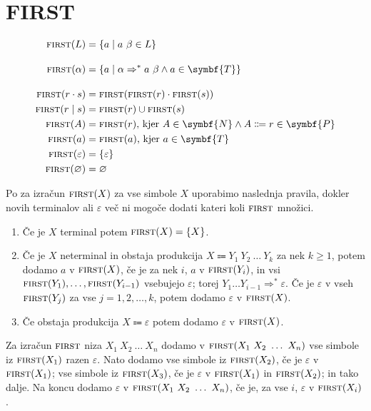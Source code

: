 \documentclass{report}
\newcommand{\Empty}{\varnothing}
\newcommand{\Null}{\varepsilon}
\newcommand{\Seq}{\cdot}
\newcommand{\Spc}{\ }
\newcommand{\Union}{\mathrel{|}}
\newcommand{\Set}[1]{\symbf{#1}}
\newcommand{\FIRST}{\textsc{first}}
\newcommand{\Terminals}{\Set{T}}
\newcommand{\Productions}{\Set{P}}
\newcommand{\NonTerminals}{\Set{N}}
\newcommand{\Arrow}{\Coloneq}
\newlength{\arrow}
\newcommand{\DeriveStar}{\Rightarrow^\ast}
\newcommand{\NT}[1]{{#1}}
\newcommand{\T}[1]{{#1}}
\newcommand{\Sym}[1]{{#1}}
\begin{document}
\section{FIRST}
\begin{tcolorbox}[title={Definicija}]
  \begin{equation*}
    \begin{aligned}
      \FIRST(L) &= \{ \T{a} \mid \T{a} \Spc \beta \in L \}\\[1em]
      \FIRST(\alpha) &= \{\T{a} \mid \alpha \DeriveStar \T{a} \Spc \beta \land \T{a} \in \Terminals\}\\[1em]
      \FIRST(r \Seq s) &= \FIRST(\FIRST(r) \Seq \FIRST(s))\\
      \FIRST(r \Union s) &= \FIRST(r) \cup \FIRST(s)\\
      \FIRST(\NT{A}) &= \FIRST(r)\text{, kjer } \T{A} \in \NonTerminals \land \NT{A} \Arrow r \in \Productions\\
      \FIRST(\T{a}) &= \FIRST(\T{a})\text{, kjer } \T{a} \in \Terminals\\
      \FIRST(\Null) &= \{\Null\}\\
      \FIRST(\Empty) &= \Empty
    \end{aligned}
  \end{equation*}
\end{tcolorbox}

Po \cite{dragonbook} za izračun $\FIRST(\Sym{X})$ za vse simbole $\Sym{X}$ uporabimo naslednja pravila, dokler novih terminalov ali $\Null$ več ni mogoče dodati kateri koli $\FIRST$ množici.

\begin{enumerate}
  \item Če je $\Sym{X}$ terminal potem $\FIRST(\Sym{X}) = \{\Sym{X}\}$.
  \item Če je $\Sym{X}$ neterminal in obstaja produkcija $\Sym{X} \Arrow \Sym{Y}_1 \Spc \Sym{Y}_2 \Spc \dots \Spc \Sym{Y}_k$ za nek $k \geq 1$, potem dodamo $\T{a}$ v $\FIRST(\Sym{X})$, če je za nek $i$, $\T{a}$ v $\FIRST(\Sym{Y}_i)$, in vsi $\FIRST(\Sym{Y}_1), \dots, \FIRST(\Sym{Y}_{i - 1})$ vsebujejo $\Null$; torej $\Sym{Y}_1 \dots \Sym{Y}_{i - 1} \DeriveStar \Null$.
    Če je $\Null$ v vseh $\FIRST(\Sym{Y}_j)$ za vse $j = 1, 2, \dots, k$, potem dodamo $\Null$ v $\FIRST(\Sym{X})$.
  \item Če obstaja produkcija $\Sym{X} \Arrow \Null$ potem dodamo $\Null$ v $\FIRST(\Sym{X})$.
\end{enumerate}

Za izračun $\FIRST$ niza $\Sym{X}_1 \Spc \Sym{X}_2 \Spc \dots \Spc \Sym{X}_n$ dodamo v $\FIRST(\Sym{X}_1 \Spc \Sym{X}_2 \Spc \dots \Spc \Sym{X}_n)$ vse simbole iz $\FIRST(\Sym{X}_1)$ razen $\Null$. Nato dodamo vse simbole iz $\FIRST(\Sym{X}_2)$, če je $\Null$ v $\FIRST(\Sym{X}_1)$; vse simbole iz $\FIRST(\Sym{X}_3)$, če je $\Null$ v $\FIRST(\Sym{X}_1)$ in $\FIRST(\Sym{X}_2)$; in tako dalje.
Na koncu dodamo $\Null$ v $\FIRST(\Sym{X}_1 \Spc \Sym{X}_2 \Spc \dots \Spc \Sym{X}_n)$, če je, za vse $i$, $\Null$ v $\FIRST(\Sym{X}_i)$.
\end{document}
